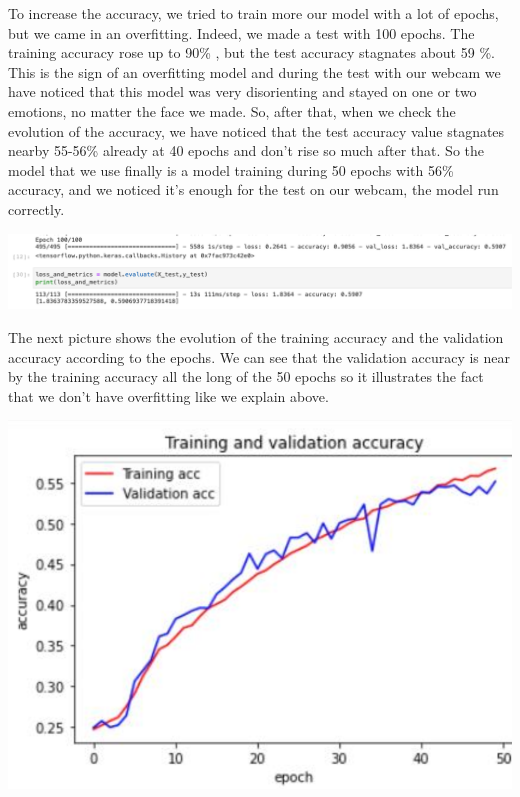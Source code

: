 \documentclass[a4paper, 10pt, conference]{ieeeconf}      %
\begin{document}
To increase the accuracy, we tried to train more our model with a lot of epochs, but we came in an overfitting.
Indeed, we made a test with 100 epochs.
The training accuracy rose up to 90\% , but the test accuracy stagnates about 59 \%.
This is the sign of an overfitting model and during the test with our webcam we have noticed that this model was very disorienting and stayed on one or two emotions, no matter the face we made.
So, after that, when we check the evolution of the accuracy, we have noticed that the test accuracy value stagnates nearby 55-56\% already at 40 epochs and don’t rise so much after that.
So the model that we use finally is a model training during 50 epochs with 56\% accuracy, and we noticed it’s enough for the test on our webcam, the model run correctly.

\begin{center}
\includegraphics[scale=0.45]{Bad_Results}
\label{fig9}
\end{center}

The next picture shows the evolution of the training accuracy and the validation accuracy according to the epochs.
We can see that the validation accuracy is near by the training accuracy all the long of the 50 epochs so it illustrates the fact that we don't have overfitting like we explain above.

\begin{center}
\includegraphics[scale=0.5]{Graph_training_test}
\label{fig10}
\end{center}
\end{document}
